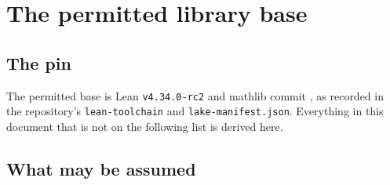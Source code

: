 \chapter{The permitted library base}\label{ch:base}

\section{The pin}

The permitted base is Lean \texttt{v4.34.0-rc2} and mathlib commit
, as recorded in the
repository's \texttt{lean-toolchain} and \texttt{lake-manifest.json}.
Everything in this document that is not on the following list is derived
here.

\section{What may be assumed}

